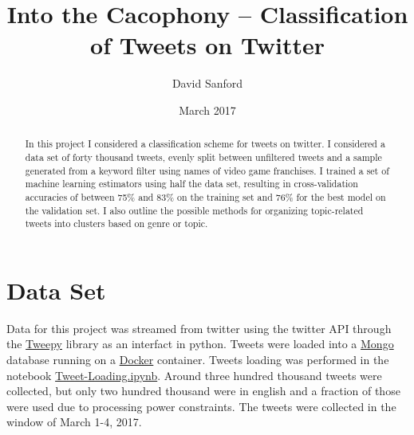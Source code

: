 \documentclass[11pt]{revtex4-1}
\newcommand{\PRE}[1]{{#1}}
\newcommand{\secref}[1]{Sec.~\ref{sec:#1}}
\begin{document}
\title{ \PRE{\vspace*{1.5in}} Into the Cacophony -- Classification of
  Tweets on Twitter \PRE{\vspace*{0.3in}}}

\author{David Sanford}

\date{March 2017}

\begin{abstract}
\PRE{\vspace*{.3in}} In this project I considered a classification
scheme for tweets on twitter.  I considered a data set of forty
thousand tweets, evenly split between unfiltered tweets and a sample
generated from a keyword filter using names of video game franchises.
I trained a set of machine learning estimators using half the data
set, resulting in cross-validation accuracies of between 75\% and 83\%
on the training set and 76\% for the best model on the validation set.
I also outline the possible methods for organizing topic-related
tweets into clusters based on genre or topic.
\end{abstract}

\maketitle







\section{Data Set}
\label{sec:data}

Data for this project was streamed from twitter using the twitter API
through the \href{http://pythonhosted.org/tweepy/}{\sc Tweepy} library
as an interfact in python.  Tweets were loaded into a
\href{http://www.mongodb.com/}{\sc Mongo} database running on a
\href{http://www.docker.com/}{\sc Docker} container.  Tweets loading
was performed in the notebook
\href{http://github.com/davidsanford/DSI_Capstone/blob/master/Tweet-Loading.ipynb}{Tweet-Loading.ipynb}.
Around three hundred thousand tweets were collected, but only two
hundred thousand were in english and a fraction of those were used due
to processing power constraints.  The tweets were collected in the
window of March 1-4, 2017.
\end{document}
